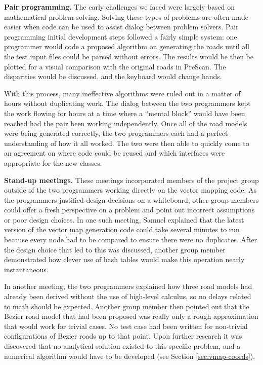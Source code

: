 \documentclass[12pt,twoside]{article}
\begin{document}
\textbf{Pair programming.}
The early challenges we faced were largely based on mathematical problem solving. Solving these types of problems are often made easier when code can be used to assist dialog between problem solvers. Pair programming initial development steps followed a fairly simple system: one programmer would code a proposed algorithm on generating the roads until all the test input files could be parsed without errors. The results would be then be plotted for a visual comparison with the original roads in PreScan. The disparities would be discussed, and the keyboard would change hands.

With this process, many ineffective algorithms were ruled out in a matter of hours without duplicating work. The dialog between the two programmers kept the work flowing for hours at a time where a ``mental block'' would have been reached had the pair been working independently. Once all of the road models were being generated correctly, the two programmers each had a perfect understanding of how it all worked. The two were then able to quickly come to an agreement on where code could be reused and which interfaces were appropriate for the new classes.

\textbf{Stand-up meetings.}
These meetings incorporated members of the project group outside of the two programmers working directly on the vector mapping code. As the programmers justified design decisions on a whiteboard, other group members could offer a fresh perspective on a problem and point out incorrect assumptions or poor design choices. In one such meeting, Samuel explained that the latest version of the vector map generation code could take several minutes to run because every node had to be compared to ensure there were no duplicates. After the design choice that led to this was discussed, another group member demonstrated how clever use of hash tables would make this operation nearly instantaneous.

In another meeting, the two programmers explained how three road models had already been derived without the use of high-level calculus, so no delays related to math should be expected. Another group member then pointed out that the Bezier road model that had been proposed was really only a rough approximation that would work for trivial cases. No test case had been written for non-trivial configurations of Bezier roads up to that point. Upon further research it was discovered that no analytical solution existed to this specific problem, and a numerical algorithm would have to be developed (see Section \ref{sec:vmap-coords}).
\end{document}

